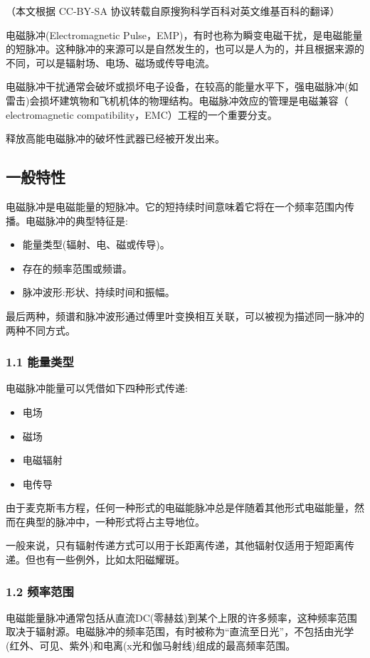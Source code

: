 
（本文根据 CC-BY-SA 协议转载自原搜狗科学百科对英文维基百科的翻译）

电磁脉冲(Electromagnetic Pulse，EMP)，有时也称为瞬变电磁干扰，是电磁能量的短脉冲。这种脉冲的来源可以是自然发生的，也可以是人为的，并且根据来源的不同，可以是辐射场、电场、磁场或传导电流。

电磁脉冲干扰通常会破坏或损坏电子设备，在较高的能量水平下，强电磁脉冲(如雷击)会损坏建筑物和飞机机体的物理结构。电磁脉冲效应的管理是电磁兼容（ electromagnetic compatibility，EMC）工程的一个重要分支。

释放高能电磁脉冲的破坏性武器已经被开发出来。

\subsection{一般特性}
电磁脉冲是电磁能量的短脉冲。它的短持续时间意味着它将在一个频率范围内传播。电磁脉冲的典型特征是:
\begin{itemize}
\item 能量类型(辐射、电、磁或传导)。
\item 存在的频率范围或频谱。
\item 脉冲波形:形状、持续时间和振幅。
\end{itemize}
最后两种，频谱和脉冲波形通过傅里叶变换相互关联，可以被视为描述同一脉冲的两种不同方式。
\subsubsection{1.1 能量类型}
电磁脉冲能量可以凭借如下四种形式传递:
\begin{itemize}
\item 电场
\item 磁场
\item 电磁辐射
\item 电传导
\end{itemize}
由于麦克斯韦方程，任何一种形式的电磁能脉冲总是伴随着其他形式电磁能量，然而在典型的脉冲中，一种形式将占主导地位。

一般来说，只有辐射传递方式可以用于长距离传递，其他辐射仅适用于短距离传递。但也有一些例外，比如太阳磁耀斑。
\subsubsection{1.2 频率范围}
电磁能量脉冲通常包括从直流DC(零赫兹)到某个上限的许多频率，这种频率范围取决于辐射源。电磁脉冲的频率范围，有时被称为“直流至日光”，不包括由光学(红外、可见、紫外)和电离(x光和伽马射线)组成的最高频率范围。

